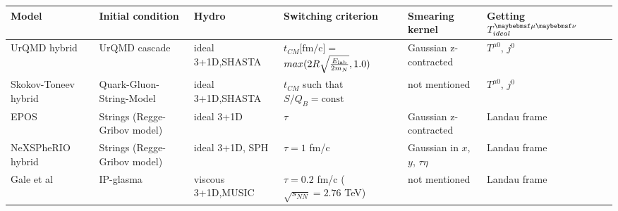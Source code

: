 \begin{table}
  \begin{tabular}{p{2.5cm}p{2.5cm}p{2.5cm}p{3cm}p{2.5cm}p{2.5cm}p{2.5cm}}
  \toprule[1.5pt]
   Model      &   Initial condition  & Hydro  & Switching \newline criterion &
   Smearing \newline kernel & Getting \newline $\Tmn_{ideal}$ \\

   \midrule[1pt]
     UrQMD \newline hybrid~\cite{Petersen:2008dd} &
     UrQMD \newline cascade &
     ideal 3+1D,\newline SHASTA &
     $t_{CM} \text{[fm/c]} =$ \newline $max(2R \sqrt{\frac{E_\mathrm{lab}}{2m_N}}, 1.0)$ &
     Gaussian \newline z-contracted &
     $T^{\mu 0}$, $j^0$ \\

     Skokov-Toneev \newline hybrid~\cite{Skokov:2005ut} &
     Quark-Gluon- \newline String-Model &
     ideal 3+1D,\newline SHASTA &
     $t_{CM}$ such \newline that $S/Q_B = \text{const}$ &
     not \newline mentioned &
     $T^{\mu 0}$, $j^0$ \\

     EPOS~\cite{Werner:2010aa} &
     Strings (Regge-\newline Gribov model) &
     ideal 3+1D &
     $\tau$ &
     Gaussian \newline z-contracted &
     Landau frame \\

     NeXSPheRIO \newline hybrid~\cite{Andrade:2005tx,Drescher:2000ec} &
     Strings (Regge-\newline Gribov model) &
     ideal 3+1D, \newline SPH &
     $\tau = 1$ fm/c \cite{Hama:2004rr} &
     Gaussian in \newline $x$, $y$, $\tau \eta$&
     Landau frame \\

     Gale et al~\cite{Gale:2012rq} &
     IP-glasma &
     viscous 3+1D,\newline MUSIC &
     $\tau = 0.2$ fm/c \newline ($\sqrt{s_{NN}} = 2.76$ TeV) &
     not \newline mentioned &
     Landau frame \\


\end{tabular}
\end{table}

